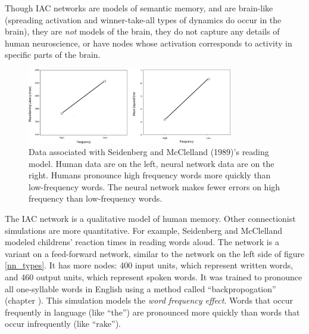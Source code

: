 Though IAC networks are models of semantic memory, and are brain-like (spreading activation and winner-take-all types of dynamics do occur in the brain), they are \emph{not} models of the brain, they do not capture any details of human neuroscience, or have nodes whose activation corresponds to activity in specific parts of the brain.

\begin{figure}[h]
\centering
\includegraphics[width=0.8\textwidth]{./images/seidWordNet_Data3.png}
\caption[From McClelland and Seidenberg, 1989 \cite{seidenberg1989distributed}. Redrawn by Pamela Payne.]{Data associated with Seidenberg and McClelland (1989)'s reading model. Human data are on the left, neural network data are on the right. Humans pronounce high frequency words more quickly than low-frequency words. The neural network makes fewer errors on high frequency than low-frequency words.}
\label{regularityData}
\end{figure}
 
The IAC network is a qualitative model of human memory. Other connectionist simulations are more quantitative. For example, Seidenberg and McClelland modeled childrens' reaction times in reading words aloud. The network is a variant on a feed-forward network, similar to the network on the left side of figure \ref{nn_types}. It has  more nodes: 400 input units, which represent written words, and 460 output units, which represent spoken words. It was trained to pronounce all one-syllable words in English using a method called ``backpropogation'' (chapter ). This simulation models  the \emph{word frequency effect}. Words that occur frequently in language (like ``the'') are pronounced more quickly than words that occur infrequently (like ``rake'').

